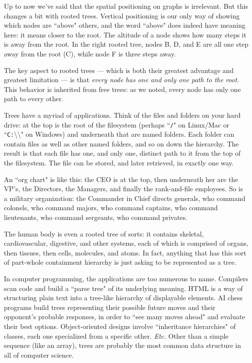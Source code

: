 Up to now we've said that the spatial positioning on graphs is irrelevant.
But this changes a bit with rooted trees. Vertical positioning is our only
way of showing which nodes are ``above" others, and the word ``above" does
indeed have meaning here: it means closer to the root. The altitude of a
node shows how many steps it is away from the root. In the right rooted
tree, nodes B, D, and E are all one step away from the root (C), while node
F is three steps away.

The key aspect to rooted trees --- which is both their greatest advantage
and greatest limitation --- is that \textit{every node has one and only one
path to the root.} This behavior is inherited from free trees: as we noted,
every node has only one path to every other.

Trees have a myriad of applications. Think of the files and folders on your
hard drive: at the top is the root of the filesystem (perhaps ``\texttt{/}"
on Linux/Mac or ``\texttt{C:}\textbackslash\textbackslash" on Windows) and
underneath that are named folders. Each folder can contain files as well as
other named folders, and so on down the hierarchy. The result is that each
file has one, and only one, distinct path to it from the top of the
filesystem.  The file can be stored, and later retrieved, in exactly one
way.

An ``org chart" is like this: the CEO is at the top, then underneath her
are the VP's, the Directors, the Managers, and finally the rank-and-file
employees. So is a military organization: the Commander in Chief directs
generals, who command colonels, who command majors, who command captains,
who command lieutenants, who command sergeants, who command privates.

The human body is even a rooted tree of sorts: it contains skeletal,
cardiovascular, digestive, and other systems, each of which is comprised of
organs, then tissues, then cells, molecules, and atoms. In fact, anything
that has this sort of part-whole containment hierarchy is just asking to be
represented as a tree.

In computer programming, the applications are too numerous to name.
Compilers scan code and build a ``parse tree" of its underlying meaning.
HTML is a way of structuring plain text into a tree-like hierarchy of
displayable elements. AI chess programs build trees representing their
possible future moves and their opponent's probable responses, in order to
``see many moves ahead" and evaluate their best options. Object-oriented
designs involve ``inheritance hierarchies" of classes, each one specialized
from a specific other. \textit{Etc.} Other than a simple sequence (like an
array), trees are probably the most common data structure in all of
computer science.

